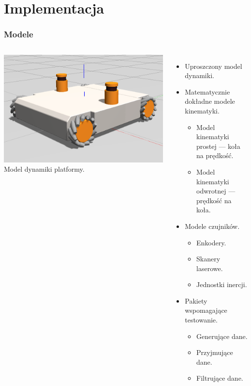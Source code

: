 \documentclass{beamer}
\begin{document}
	\section{Implementacja}
	\begin{frame}
		\frametitle{Modele}
		\begin{columns}[c]
				\centering
				\includegraphics[width=\textwidth]{graphics/model.png} \\
				Model dynamiki platformy.
				\begin{itemize}
					\item Uproszczony model dynamiki.
					\item Matematycznie dokładne modele kinematyki.
					\begin{itemize}
						\item Model kinematyki prostej --- koła na prędkość.
						\item Model kinematyki odwrotnej --- prędkość na koła.
					\end{itemize}
					\item Modele czujników.
					\begin{itemize}
						\item Enkodery.
						\item Skanery laserowe.
						\item Jednostki inercji.
					\end{itemize}
					\item Pakiety wspomagające testowanie.
					\begin{itemize}
						\item Generujące dane.
						\item Przyjmujące dane.
						\item Filtrujące dane.
					\end{itemize}
				\end{itemize}
		\end{columns}
	\end{frame}
	
\end{document}
